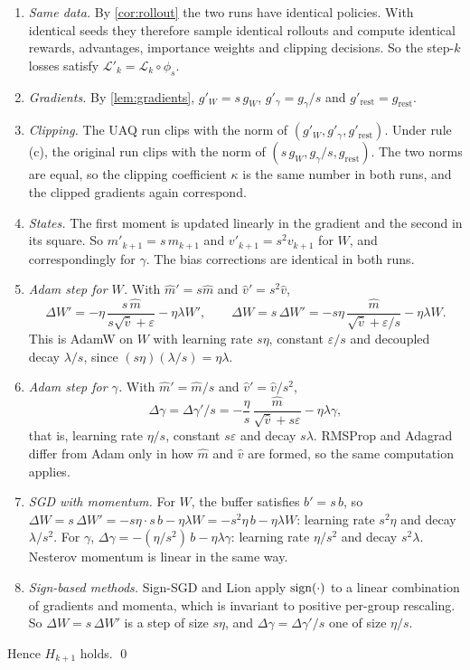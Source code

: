 \begin{enumerate}[leftmargin=*,itemsep=2pt]
\item \emph{Same data.} By \cref{cor:rollout} the two runs have identical policies. With identical seeds they therefore sample identical rollouts and compute identical rewards, advantages, importance weights and clipping decisions. So the step-$k$ losses satisfy $\mathcal L'_k=\mathcal L_k\circ\phi_s$.
\item \emph{Gradients.} By \cref{lem:gradients}, $g'_W=s\,g_W$, $g'_\gamma=g_\gamma/s$ and $g'_{\mathrm{rest}}=g_{\mathrm{rest}}$.
\item \emph{Clipping.} The UAQ run clips with the norm of $(g'_W,g'_\gamma,g'_{\mathrm{rest}})$. Under rule (c), the original run clips with the norm of $(s\,g_W,g_\gamma/s,g_{\mathrm{rest}})$. The two norms are equal, so the clipping coefficient $\kappa$ is the same number in both runs, and the clipped gradients again correspond.
\item \emph{States.} The first moment is updated linearly in the gradient and the second in its square. So $m'_{k+1}=s\,m_{k+1}$ and $v'_{k+1}=s^2v_{k+1}$ for $W$, and correspondingly for $\gamma$. The bias corrections are identical in both runs.
\item \emph{Adam step for $W$.} With $\hat m'=s\hat m$ and $\hat v'=s^2\hat v$,
\[
\Delta W'=-\eta\,\frac{s\,\hat m}{s\sqrt{\hat v}+\varepsilon}-\eta\lambda W',
\qquad
\Delta W=s\,\Delta W'=-s\eta\,\frac{\hat m}{\sqrt{\hat v}+\varepsilon/s}-\eta\lambda W .
\]
This is AdamW on $W$ with learning rate $s\eta$, constant $\varepsilon/s$ and decoupled decay $\lambda/s$, since $(s\eta)(\lambda/s)=\eta\lambda$.
\item \emph{Adam step for $\gamma$.} With $\hat m'=\hat m/s$ and $\hat v'=\hat v/s^2$,
\[
\Delta\gamma=\Delta\gamma'/s=-\frac{\eta}{s}\,\frac{\hat m}{\sqrt{\hat v}+s\varepsilon}-\eta\lambda\gamma ,
\]
that is, learning rate $\eta/s$, constant $s\varepsilon$ and decay $s\lambda$. RMSProp and Adagrad differ from Adam only in how $\hat m$ and $\hat v$ are formed, so the same computation applies.
\item \emph{SGD with momentum.} For $W$, the buffer satisfies $b'=s\,b$, so $\Delta W=s\,\Delta W'=-s\eta\cdot s\,b-\eta\lambda W=-s^2\eta\,b-\eta\lambda W$: learning rate $s^2\eta$ and decay $\lambda/s^2$. For $\gamma$, $\Delta\gamma=-(\eta/s^2)\,b-\eta\lambda\gamma$: learning rate $\eta/s^2$ and decay $s^2\lambda$. Nesterov momentum is linear in the same way.
\item \emph{Sign-based methods.} Sign-SGD and Lion apply $\operatorname{sign}(\cdot)$ to a linear combination of gradients and momenta, which is invariant to positive per-group rescaling. So $\Delta W=s\,\Delta W'$ is a step of size $s\eta$, and $\Delta\gamma=\Delta\gamma'/s$ one of size $\eta/s$.
\end{enumerate}
Hence $H_{k+1}$ holds. \qed

